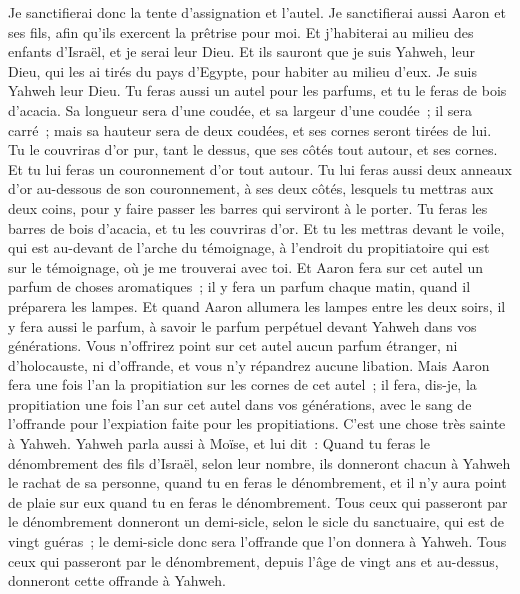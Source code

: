 \begin{multicols}{2}
Je sanctifierai donc la tente d'assignation et l'autel. Je sanctifierai aussi Aaron et ses fils, afin qu'ils exercent la prêtrise pour moi.
 Et j'habiterai au milieu des enfants d'Israël, et je serai leur Dieu.
Et ils sauront que je suis Yahweh, leur Dieu, qui les ai tirés du pays d'Egypte, pour habiter au milieu d'eux. Je suis Yahweh leur Dieu.
\VerseOne{}Tu feras aussi un autel pour les parfums, et tu le feras de bois d'acacia.
Sa longueur sera d'une coudée, et sa largeur d'une coudée~; il sera carré~; mais sa hauteur sera de deux coudées, et ses cornes seront tirées de lui.
Tu le couvriras d'or pur, tant le dessus, que ses côtés tout autour, et ses cornes. Et tu lui feras un couronnement d'or tout autour.
Tu lui feras aussi deux anneaux d'or au-dessous de son couronnement, à ses deux côtés, lesquels tu mettras aux deux coins, pour y faire passer les barres qui serviront à le porter.
Tu feras les barres de bois d'acacia, et tu les couvriras d'or.
Et tu les mettras devant le voile, qui est au-devant de l'arche du témoignage, à l'endroit du propitiatoire qui est sur le témoignage, où je me trouverai avec toi.
Et Aaron fera sur cet autel un parfum de choses aromatiques~; il y fera un parfum chaque matin, quand il préparera les lampes.
Et quand Aaron allumera les lampes entre les deux soirs, il y fera aussi le parfum, à savoir le parfum perpétuel devant Yahweh dans vos générations.
Vous n'offrirez point sur cet autel aucun parfum étranger, ni d'holocauste, ni d'offrande, et vous n'y répandrez aucune libation.
Mais Aaron fera une fois l'an la propitiation sur les cornes de cet autel~; il fera, dis-je, la propitiation une fois l'an sur cet autel dans vos générations, avec le sang de l'offrande pour l'expiation faite pour les propitiations. C'est une chose très sainte à Yahweh.
Yahweh parla aussi à Moïse, et lui dit~:
Quand tu feras le dénombrement des fils d'Israël, selon leur nombre, ils donneront chacun à Yahweh le rachat de sa personne, quand tu en feras le dénombrement, et il n'y aura point de plaie sur eux quand tu en feras le dénombrement.
Tous ceux qui passeront par le dénombrement donneront un demi-sicle, selon le sicle du sanctuaire, qui est de vingt guéras~; le demi-sicle donc sera l'offrande que l'on donnera à Yahweh.
Tous ceux qui passeront par le dénombrement, depuis l'âge de vingt ans et au-dessus, donneront cette offrande à Yahweh.

\end{multicols}
